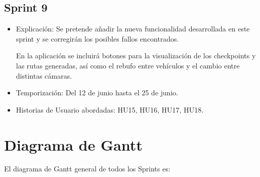 \subsection{Sprint 9}

\begin{itemize}
    \item Explicación: Se pretende añadir la nueva funcionalidad desarrollada en este sprint y se corregirán los posibles fallos encontrados.
    
    En la aplicación se incluirá botones para la visualización de los checkpoints y las rutas generadas, así como el rebufo entre vehículos y el cambio entre distintas cámaras.

    \item Temporización: Del 12 de junio hasta el 25 de junio.
    \item Historias de Usuario abordadas: HU15, HU16, HU17, HU18.
\end{itemize}


\newpage
\section{Diagrama de Gantt}

El diagrama de Gantt general de todos los Sprints es:


